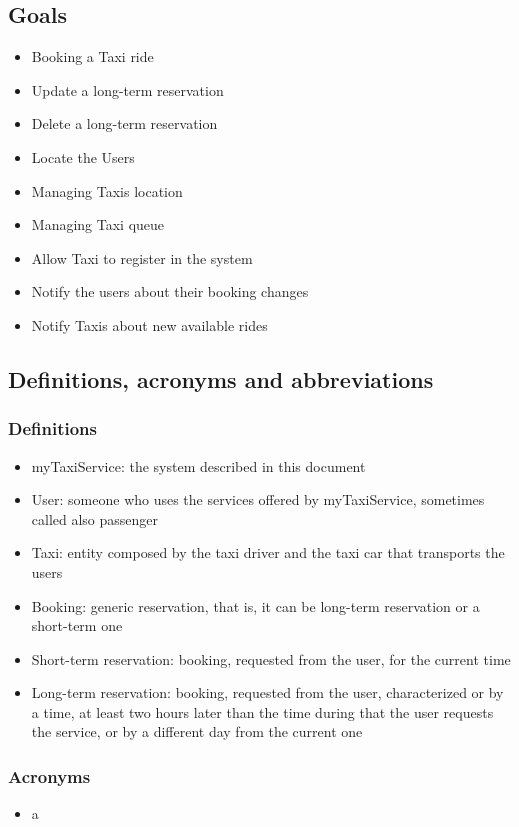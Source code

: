 	\subsection{Goals}
	\begin{itemize}
		\item Booking a Taxi ride
		\item Update a long-term reservation
		\item Delete a long-term reservation
		\item Locate the Users
		\item Managing Taxis location
		\item Managing Taxi queue
		\item Allow Taxi to register in the system
		\item Notify the users about their booking changes
		\item Notify Taxis about new available rides
	\end{itemize}
	
	\subsection{Definitions, acronyms and abbreviations}
		\subsubsection{Definitions}
		\begin{itemize}
			\item myTaxiService: the system described in this document
			\item User: someone who uses the services offered by myTaxiService, sometimes called also passenger
			\item Taxi: entity composed by the taxi driver and the taxi car that transports the users
			\item Booking: generic reservation, that is, it can be long-term reservation or a short-term one
			\item Short-term reservation: booking, requested from the user, for the current time
			\item Long-term reservation: booking, requested from the user, characterized or by a time, at least two hours later than the time during that the user requests the service, or by a different day from the current one
		\end{itemize}
		\subsubsection{Acronyms}
		\begin{itemize}
			\item a
		\end{itemize}
